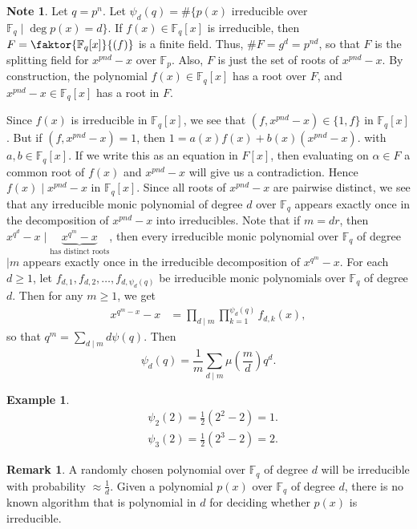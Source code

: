 \documentclass[10pt,letterpaper,cm]{nupset}
\theoremstyle{definition}
\newtheorem{exmp}{Example}
\newtheorem{note}{Note}
\newtheorem{remark}{Remark}
\newcommand{\F}{\mathbb F}
\newcommand{\1}{\mathbf{1}}
\newcommand{\0}{\vec 0}
\begin{document}
\begin{note}
Let $q= p^n$. Let $\psi_d(q) = \#\{p(x)$ irreducible over $\F_q \mid \deg{p(x)} =d \}$. If $f(x) \in \F_q[x]$ is irreducible, then $F = \faktor{\F_q[x]}{(f)}$ is a finite field. Thus, $\#F = g^d = p^{nd}$, so that $F$ is the splitting field for $x^{pnd}-x$ over $\F_p$. Also, $F$ is just the set of roots of $x^{pnd}-x$.  By construction, the polynomial $f(x) \in \F_q[x]$ has a root over $F$, and $x^{pnd}-x \in \F_q[x]$ has a root in $F$. 

Since $f(x)$ is irreducible in $\F_q[x]$, we see that $(f, x^{pnd}-x) \in \{1,f\}$ in $\F_q[x]$. But if $(f, x^{pnd}-x)=1$, then $1 = a(x)f(x) + b(x)(x^{pnd}-x)$.  with $a, b\in \F_q[x]$. If we write this as an equation in $F[x]$, then evaluating on $\alpha \in F$ a common root of $f(x)$ and $x^{pnd}-x$ will give us a contradiction. Hence $f(x) \mid x^{pnd}-x$ in $\F_q[x]$. Since all roots of $x^{pnd}-x$ are pairwise distinct, we see that any irreducible monic polynomial of degree $d$ over $\F_q$ appears exactly once in the decomposition of $x^{pnd}-x$ into irreducibles. Note that if $m =dr$, then $x^{q^d}-x \mid \underbrace{x^{q^m} -x}_{\text{has distinct roots}}$, then every irreducible monic polynomial over $\F_q$ of degree $\mid m$ appears exactly once in the irreducible decomposition of $x^{q^m}-x$. For each $d\geq 1$, let $f_{d,1}, f_{d,2}, \ldots, f_{d, \psi_d(q)}$ be irreducible monic polynomials over $\F_q$ of degree $d$. Then for any $m\geq 1$, we get
\begin{align*}
x^{q^m -x}-x & = \prod_{d\mid m} \prod_{k=1}^{\psi_d(q)}f_{d,k}(x),
\end{align*}
so that $q^m = \sum_{d\mid m} d\psi(q)$. Then $$ \psi_d(q) = \frac{1}{m}\sum_{d\mid m}\mu(\frac{m}{d})q^d  .$$ 
\end{note}

\begin{exmp}
\begin{align*}
& \psi_2(2) = \frac{1}{2}(2^2-2)=1.
\\ &  \psi_3(2) = \frac{1}{2}(2^3 -2) =2.
\end{align*}
\end{exmp}

\begin{remark}
A randomly chosen polynomial over $\F_q$ of degree $d$ will be irreducible with probability $\approx \frac{1}{d}$. Given a polynomial $p(x)$ over $\F_q$ of degree $d$, there is no known algorithm that is polynomial in $d$ for deciding whether $p(x)$  is irreducible. 
\end{remark}
\end{document}
